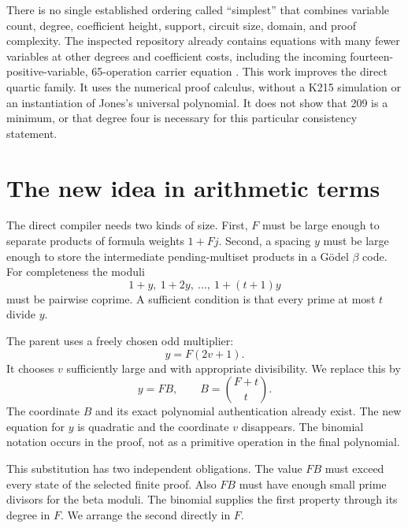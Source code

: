 \documentclass[11pt]{article}
\theoremstyle{definition}
\theoremstyle{remark}
\begin{document}
There is no single established ordering called ``simplest'' that combines
variable count, degree, coefficient height, support, circuit size, domain,
and proof complexity. The inspected repository already contains equations
with many fewer variables at other degrees and coefficient costs, including
the incoming fourteen-positive-variable, 65-operation carrier equation
\cite{carrier}. This work improves the direct quartic family. It uses the
numerical proof calculus, without a K215 simulation or an instantiation of
Jones's universal polynomial. It does not show that 209 is a minimum, or
that degree four is necessary for this particular consistency statement.

\section{The new idea in arithmetic terms}\label{sec:idea}

The direct compiler needs two kinds of size. First, $F$ must be large enough
to separate products of formula weights $1+Fj$. Second, a spacing $y$ must
be large enough to store the intermediate pending-multiset products in a
G\"odel $\beta$ code. For completeness the moduli
\[
 1+y,\ 1+2y,\ \ldots,\ 1+(t+1)y
\]
must be pairwise coprime. A sufficient condition is that every prime at most
$t$ divide $y$.

The parent uses a freely chosen odd multiplier:
\[
 y=F(2v+1).
\]
It chooses $v$ sufficiently large and with appropriate divisibility. We
replace this by
\begin{equation}\label{eq:spacing}
 \boxed{\ y=FB,\qquad B=\binom{F+t}{t}.\ }
\end{equation}
The coordinate $B$ and its exact polynomial authentication already exist.
The new equation for $y$ is quadratic and the coordinate $v$ disappears.
The binomial notation occurs in the proof, not as a primitive operation in
the final polynomial.

This substitution has two independent obligations. The value $FB$ must
exceed every state of the selected finite proof. Also $FB$ must have enough
small prime divisors for the beta moduli. The binomial supplies the first
property through its degree in $F$. We arrange the second directly in $F$.
\end{document}
